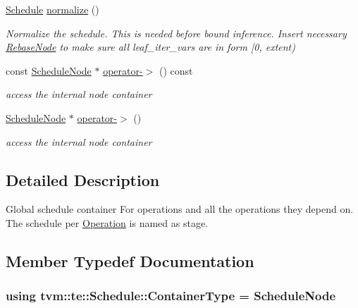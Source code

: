 \begin{DoxyCompactItemize}
\hyperlink{classtvm_1_1te_1_1Schedule}{Schedule} \hyperlink{classtvm_1_1te_1_1Schedule_a3fcdec89d8dec36d7b2586b9b0414dfe}{normalize} ()
\begin{DoxyCompactList}\small\item\em Normalize the schedule. This is needed before bound inference. Insert necessary \hyperlink{classtvm_1_1te_1_1RebaseNode}{Rebase\+Node} to make sure all leaf\+\_\+iter\+\_\+vars are in form \mbox{[}0, extent) \end{DoxyCompactList}\item 
const \hyperlink{classtvm_1_1te_1_1ScheduleNode}{Schedule\+Node} $\ast$ \hyperlink{classtvm_1_1te_1_1Schedule_a81883ca270f853eaf92d5f364888b9f4}{operator-\/$>$} () const 
\begin{DoxyCompactList}\small\item\em access the internal node container \end{DoxyCompactList}\item 
\hyperlink{classtvm_1_1te_1_1ScheduleNode}{Schedule\+Node} $\ast$ \hyperlink{classtvm_1_1te_1_1Schedule_aa30087792fd6d3b7372d56e7f3947c3f}{operator-\/$>$} ()
\begin{DoxyCompactList}\small\item\em access the internal node container \end{DoxyCompactList}\end{DoxyCompactItemize}


\subsection{Detailed Description}
Global schedule container For operations and all the operations they depend on. The schedule per \hyperlink{classtvm_1_1te_1_1Operation}{Operation} is named as stage. 

\subsection{Member Typedef Documentation}
\subsubsection[{\texorpdfstring{Container\+Type}{ContainerType}}]{\setlength{\rightskip}{0pt plus 5cm}using {\bf tvm\+::te\+::\+Schedule\+::\+Container\+Type} =  {\bf Schedule\+Node}}\hypertarget{classtvm_1_1te_1_1Schedule_afba006836979a74a799189169534189e}{}\label{classtvm_1_1te_1_1Schedule_afba006836979a74a799189169534189e}


